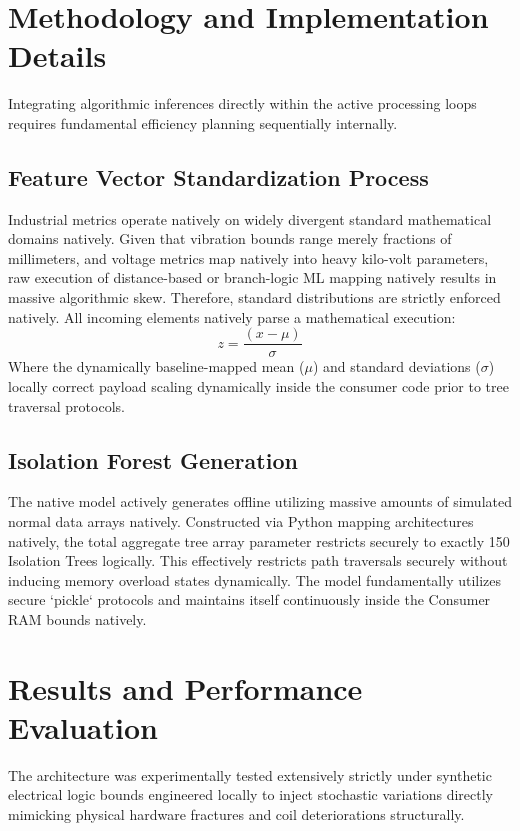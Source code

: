 \documentclass[12pt, a4paper]{article}
\begin{document}
\section{Methodology and Implementation Details}

Integrating algorithmic inferences directly within the active processing loops requires fundamental efficiency planning sequentially internally. 

\subsection{Feature Vector Standardization Process}
Industrial metrics operate natively on widely divergent standard mathematical domains natively. Given that vibration bounds range merely fractions of millimeters, and voltage metrics map natively into heavy kilo-volt parameters, raw execution of distance-based or branch-logic ML mapping natively results in massive algorithmic skew. Therefore, standard distributions are strictly enforced natively. All incoming elements natively parse a mathematical execution:
\begin{equation}
    z = \frac{(x - \mu)}{\sigma}
\end{equation}
Where the dynamically baseline-mapped mean ($\mu$) and standard deviations ($\sigma$) locally correct payload scaling dynamically inside the consumer code prior to tree traversal protocols.

\subsection{Isolation Forest Generation}
The native model actively generates offline utilizing massive amounts of simulated normal data arrays natively. Constructed via Python mapping architectures natively, the total aggregate tree array parameter restricts securely to exactly 150 Isolation Trees logically. This effectively restricts path traversals securely without inducing memory overload states dynamically. The model fundamentally utilizes secure `pickle` protocols and maintains itself continuously inside the Consumer RAM bounds natively.

\section{Results and Performance Evaluation}

The architecture was experimentally tested extensively strictly under synthetic electrical logic bounds engineered locally to inject stochastic variations directly mimicking physical hardware fractures and coil deteriorations structurally.
\end{document}
